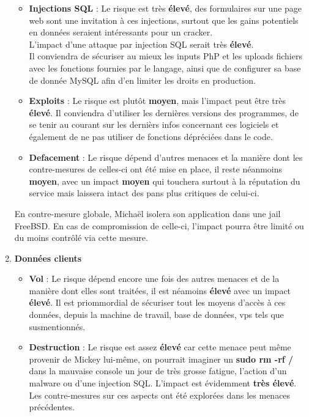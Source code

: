 \documentclass[a4paper,10pt,final,fleqn]{article}
\begin{document}
\begin{enumerate}
					\begin{itemize}
						\item \textbf{Injections SQL} : Le risque est très \textbf{élevé}, des formulaires sur une page web sont une invitation à ces injections, surtout que les gains potentiels en données seraient intéressants pour un cracker.\\
						L'impact d'une attaque par injection SQL serait très \textbf{élevé}.\\
						Il conviendra de sécuriser au mieux les inputs PhP et les uploads fichiers avec les fonctions fournies par le langage, ainsi que de configurer sa base de donnée MySQL afin d'en limiter les droits en production.\\
						\item \textbf{Exploits} : Le risque est plutôt \textbf{moyen}, mais l'impact peut être très \textbf{élevé}. Il conviendra d'utiliser les dernières versions des programmes, de se tenir au courant sur les dernièrs infos concernant ces logiciels et également de ne pas utiliser de fonctions dépréciées dans le code.
						\item \textbf{Defacement} : Le risque dépend d'autres menaces et la manière dont les contre-mesures de celles-ci ont été mise en place, il reste néanmoins \textbf{moyen}, avec un impact \textbf{moyen} qui touchera surtout à la réputation du service mais laissera intact des pans plus critiques de celui-ci.\\

					\end{itemize}

					En contre-mesure globale, Michaël isolera son application dans une jail FreeBSD. En cas de compromission de celle-ci, l'impact pourra être limité ou du moins contrôlé via cette mesure. 
					
				\item \textbf{Données clients}

					\begin{itemize}
						\item \textbf{Vol} : Le risque dépend encore une fois des autres menaces et de la manière dont elles sont traitées, il est néamoins \textbf{élevé} avec un impact \textbf{élevé}. Il est priommordial de sécuriser tout les moyens d'accès à ces données, depuis la machine de travail, base de données, vps tels que susmentionnés.\\
						\item \textbf{Destruction} : Le risque est assez \textbf{élevé} car cette menace peut même provenir de Mickey lui-même, on pourrait imaginer un \textbf{sudo rm -rf /} dans la mauvaise console un jour de très grosse fatigue, l'action d'un malware ou d'une injection SQL. L'impact est évidemment \textbf{très élevé}.\\
						Les contre-mesures sur ces aspects ont été explorées dans les menaces précédentes.\\
					\end{itemize}
					

\end{enumerate}
\end{document}
